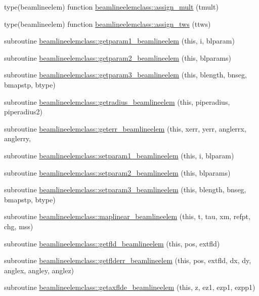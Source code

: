 \begin{DoxyCompactItemize}
\item 
type(beamlineelem) function \mbox{\hyperlink{namespacebeamlineelemclass_aacf4de73999b66f3e37bf58cda6e562b}{beamlineelemclass\+::assign\+\_\+mult}} (tmult)
\item 
type(beamlineelem) function \mbox{\hyperlink{namespacebeamlineelemclass_a097831d1513c1bbd70e5f97dea56fcd4}{beamlineelemclass\+::assign\+\_\+tws}} (ttws)
\item 
subroutine \mbox{\hyperlink{namespacebeamlineelemclass_a52595a459a442685b5ab427a2fdb27c8}{beamlineelemclass\+::getparam1\+\_\+beamlineelem}} (this, i, blparam)
\item 
subroutine \mbox{\hyperlink{namespacebeamlineelemclass_ab0803e0260eb5f57a59a7d1f70cf7050}{beamlineelemclass\+::getparam2\+\_\+beamlineelem}} (this, blparams)
\item 
subroutine \mbox{\hyperlink{namespacebeamlineelemclass_a0b69da010861c6ca72da3822335a7b2f}{beamlineelemclass\+::getparam3\+\_\+beamlineelem}} (this, blength, bnseg, bmapstp, btype)
\item 
subroutine \mbox{\hyperlink{namespacebeamlineelemclass_aa3e3f73b38a31d67a955712c9706a2bd}{beamlineelemclass\+::getradius\+\_\+beamlineelem}} (this, piperadius, piperadius2)
\item 
subroutine \mbox{\hyperlink{namespacebeamlineelemclass_aa02696ccb3d6d48bfdcb0ff3ea906fa1}{beamlineelemclass\+::geterr\+\_\+beamlineelem}} (this, xerr, yerr, anglerrx, anglerry,
\item 
subroutine \mbox{\hyperlink{namespacebeamlineelemclass_a2475c641494686c9c9688a8b15975cbf}{beamlineelemclass\+::setparam1\+\_\+beamlineelem}} (this, i, blparam)
\item 
subroutine \mbox{\hyperlink{namespacebeamlineelemclass_a2ac6f016596ac46cf326e023cbb3f23b}{beamlineelemclass\+::setparam2\+\_\+beamlineelem}} (this, blparams)
\item 
subroutine \mbox{\hyperlink{namespacebeamlineelemclass_a604cc75bca5926a1918df8c19454e41e}{beamlineelemclass\+::setparam3\+\_\+beamlineelem}} (this, blength, bnseg, bmapstp, btype)
\item 
subroutine \mbox{\hyperlink{namespacebeamlineelemclass_a76cac49c6e8615751de8c9f8bbba2641}{beamlineelemclass\+::maplinear\+\_\+beamlineelem}} (this, t, tau, xm, refpt, chg, mss)
\item 
subroutine \mbox{\hyperlink{namespacebeamlineelemclass_a21fd373bab34a4c18c8bcf5b00816c0c}{beamlineelemclass\+::getfld\+\_\+beamlineelem}} (this, pos, extfld)
\item 
subroutine \mbox{\hyperlink{namespacebeamlineelemclass_aa711cecfd3c01152cb0d88d88b645c4b}{beamlineelemclass\+::getflderr\+\_\+beamlineelem}} (this, pos, extfld, dx, dy, anglex, angley, anglez)
\item 
subroutine \mbox{\hyperlink{namespacebeamlineelemclass_aa38d23f41bd5b34e31e784e1bb1b4ba2}{beamlineelemclass\+::getaxflde\+\_\+beamlineelem}} (this, z, ez1, ezp1, ezpp1)
\end{DoxyCompactItemize}


